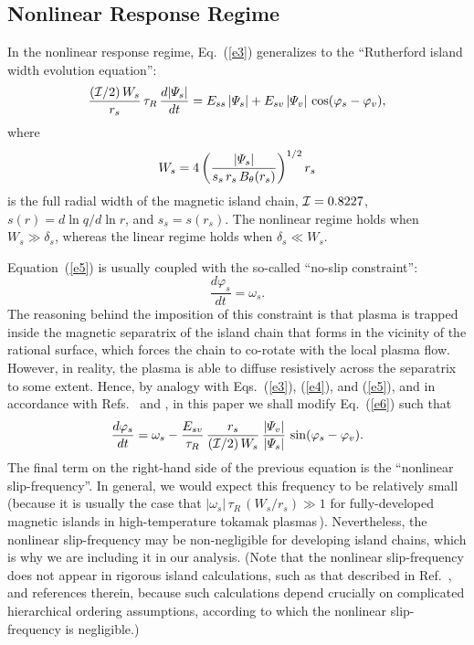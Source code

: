 \documentclass[12pt,prb,aps]{revtex4-1}
\begin{document}
\subsection{Nonlinear Response Regime}
In the nonlinear response regime, Eq.~(\ref{e3}) generalizes to the ``Rutherford island width evolution equation'':\,\cite{ruth,ruth1}
\begin{equation}\label{e5}
\frac{({\cal I}/2)\,W_s}{r_s}\,\tau_R\,\frac{d|{\mit\Psi}_s|}{dt} = E_{ss}\,|{\mit\Psi}_s| + E_{sv}\,|{\mit\Psi}_v|\,\cos(\varphi_s-\varphi_v),
\end{equation}
where
\begin{equation}
W_s = 4\left(\frac{|{\mit\Psi}_s|}{s_s\,r_s\,B_\theta(r_s)}\right)^{1/2} r_s
\end{equation}
is the full radial width of the magnetic island chain, ${\cal I} = 0.8227$, $s(r) = d\ln q/d\ln r$, and $s_s=s(r_s)$. The
nonlinear regime holds when $W_s\gg \delta_s$, whereas the linear regime holds when $\delta_s\ll W_s$. 

Equation~(\ref{e5}) is usually coupled with the so-called ``no-slip constraint'':\,\cite{rfa}
\begin{equation}\label{e6}
\frac{d\varphi_s}{dt} = \omega_s.
\end{equation}
The reasoning behind the imposition of this constraint is that  plasma is trapped inside the
magnetic separatrix of the  island chain that forms in the vicinity of the rational surface,
which forces the chain to co-rotate with the local plasma flow. However, in reality, the plasma
is able to diffuse resistively across the separatrix to some extent. Hence, by analogy with Eqs.~(\ref{e3}), (\ref{e4}), and (\ref{e5}), and 
in accordance with Refs.~ and , in this paper we shall modify Eq.~(\ref{e6}) such that
\begin{equation}\label{e7}
\frac{d\varphi_s}{dt} = \omega_s - \frac{E_{sv}}{\tau_R}\,\frac{r_s}{({\cal I}/2)\,W_s}\,\frac{|{\mit\Psi}_v|}{|{\mit\Psi}_s|}\,\sin(\varphi_s-\varphi_v).
\end{equation}
The final term on the right-hand side of the previous equation is the ``nonlinear slip-frequency''. In general,
we would expect this frequency to be relatively small (because it is usually the case that $|\omega_s|\,\tau_R\,(W_s/r_s)\gg 1$
for fully-developed magnetic islands in high-temperature tokamak plasmas\,\cite{rf1,slip2}). Nevertheless, the
nonlinear slip-frequency may be non-negligible for developing island chains, which is why we are including it in our analysis.
(Note that the nonlinear slip-frequency does not appear in rigorous island calculations, such as
that described in Ref.~, and references therein, because such calculations depend crucially on
complicated hierarchical ordering assumptions, according to which the nonlinear slip-frequency is negligible.)
\end{document}
